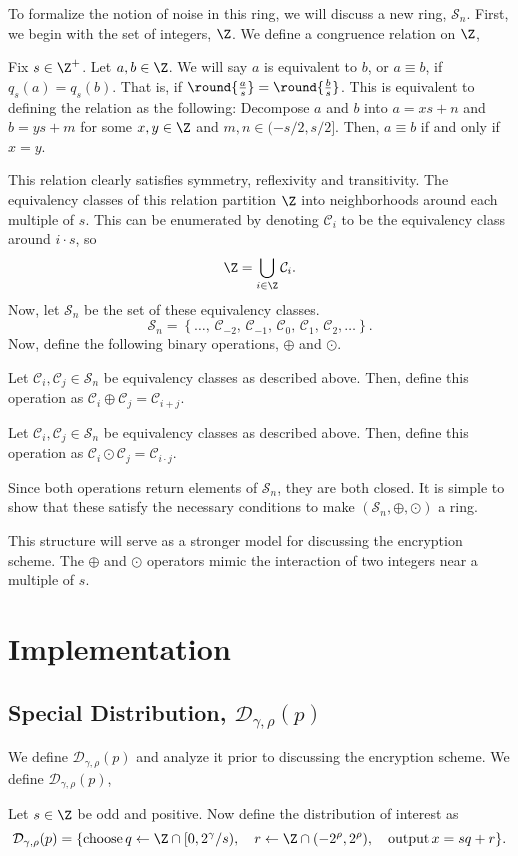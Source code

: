 \documentclass[a4paper,11pt, oneside]{article}
\newcommand{\C}[1]{\mathcal{C}_{#1}}
\renewcommand{\D}{\mathcal{D}_{\gamma,\rho}(p)}
\newcommand{\nring}{\mathcal{S}_n}
\begin{document}
To formalize the notion of noise in this ring, we will discuss a new ring, $\nring$.  First, we begin with the set of integers, $\Z$.  We define a congruence relation on $\Z$,
\begin{definition}
    Fix $s\in\Z^+$.  Let $a,b\in \Z$.  We will say $a$ is equivalent to $b$, or $a\equiv b$, if $q_s(a) = q_s(b)$.  That is, if $\round{\frac{a}{s}} = \round{\frac{b}{s}}$.  This is equivalent to defining the relation as the following:  Decompose $a$ and $b$ into $a = xs + n$ and $b = ys + m$ for some $x,y\in\Z$ and $m,n\in ( -s/2, s/2]$.  Then, $a\equiv b$ if and only if $x = y$.
\end{definition}

This relation clearly satisfies symmetry, reflexivity and transitivity.  The equivalency classes of this relation partition $\Z$ into neighborhoods around each multiple of $s$.  This can be enumerated by denoting $\mathcal{C}_i$ to be the equivalency class around $i\cdot s$, so
\[\Z= \bigcup_{i\in\Z} \C{i}.\]
Now, let $\nring$ be the set of these equivalency classes.  
\[\nring = \left\{\dots,\, \C{-2},\,\C{-1},\,\C{0},\,\C{1},\,\C{2},\dots \right\} .\]
Now, define the following binary operations, $\oplus$ and $\odot$.
\begin{definition}
    Let $\C{i},\C{j}\in\nring$ be equivalency classes as described above.  Then, define this operation as $\C{i} \oplus \C{j} = \C{i+j}$.
\end{definition}

\begin{definition}
    Let $\C{i},\C{j}\in\nring$ be equivalency classes as described above.  Then, define this operation as $\C{i} \odot \C{j} = \C{i\cdot j}$.
\end{definition}

Since both operations return elements of $\nring$, they are both closed.  It is simple to show that these satisfy the necessary conditions to make $\left(\nring, \oplus, \odot\right)$ a ring.

This structure will serve as a stronger model for discussing the encryption scheme.  The $\oplus$ and $\odot$ operators mimic the interaction of two integers near a multiple of $s$.

\section{Implementation}
    \subsection{Special Distribution, $\D$}
    We define $\D$ and analyze it prior to discussing the encryption scheme.  We define $\D$,
\begin{definition}
    Let $s\in\Z$ be odd and positive.  Now define the distribution of interest as
    \[
        \D = \{ \text{choose}\, q\leftarrow\Z\cap[0,2^\gamma/s),\quad r\leftarrow \Z\cap (-2^{\rho}, 2^\rho),\quad\text{output}\, x = sq+r\}.
        \] 
\end{definition}
\end{document}
